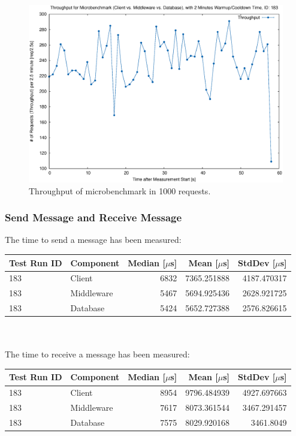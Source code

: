 \documentclass[milestone1.tex]{subfiles}
\begin{document}
\begin{figure}[H]
	\begin{center}
    \includegraphics[scale=0.55]{../exported_plots/microbenchmarks/througput.eps}
  \end{center}
  \caption{Throughput of microbenchmark in 1000 requests.}
  \label{fig:mictobenchmarkstp}
\end{figure}


\subsubsection{Send Message and Receive Message}

The time to send a message has been measured:\\

\begin{tabular}{|l|l|r|r|r|}
\hline 
Test Run ID & Component & Median [$\mu$s] & Mean [$\mu$s] & StdDev [$\mu$s] \\ \hline
183 & Client & 6832 & 7365.251888 & 4187.470317 \\ \hline
183 & Middleware & 5467 & 5694.925436 & 2628.921725 \\ \hline
183 & Database & 5424 & 5652.727388 & 2576.826615 \\ \hline
\end{tabular}
\\\\

\noindent The time to receive a message has been measured:\\

\begin{tabular}{|l|l|r|r|r|}
\hline 
Test Run ID & Component & \textbf{Median [$\mu$s]} & Mean [$\mu$s] & StdDev [$\mu$s] \\ \hline
183 & Client & 8954 & 9796.484939 & 4927.697663 \\ \hline
183 & Middleware & 7617 & 8073.361544 & 3467.291457 \\ \hline
183 & Database & 7575 & 8029.920168 & 3461.8049 \\ \hline
\end{tabular}
\\
\end{document}
